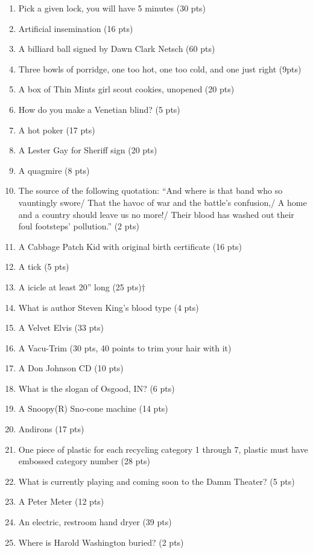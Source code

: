 \begin{enumerate}
\item Pick a given lock, you will have 5 minutes (30 pts)
\item Artificial insemination (16 pts)
\item A billiard ball signed by Dawn Clark Netsch (60 pts)
\item Three bowls of porridge, one too hot, one too cold, and one just right (9pts)
\item A box of Thin Mints {\texttrademark} girl scout cookies, unopened (20 pts)
\item How do you make a Venetian blind? (5 pts)
\item A hot poker (17 pts)
\item A Lester Gay for Sheriff sign (20 pts)
\item A quagmire (8 pts)
\item The source of the following quotation: ``And where is that band who so vauntingly swore/ That the havoc of war and the battle's confusion,/ A home and a country should leave us no more!/ Their blood has washed out their foul footsteps' pollution.'' (2 pts)
\item A Cabbage Patch Kid{\texttrademark} with original birth certificate (16 pts)
\item A tick (5 pts)
\item A icicle at least 20'' long (25 pts)$\dagger$
\item What is author Steven King's blood type (4 pts)
\item A Velvet Elvis (33 pts)
\item A Vacu-Trim{\texttrademark} (30 pts, 40 points to trim your hair with it)
\item A Don Johnson CD (10 pts)
\item What is the slogan of Osgood, IN? (6 pts)
\item A Snoopy(R) Sno-cone machine (14 pts)
\item Andirons (17 pts)
\item One piece of plastic for each recycling category 1 through 7, plastic must have embossed category number (28 pts)
\item What is currently playing and coming soon to the Damm Theater? (5 pts)
\item A Peter Meter{\texttrademark} (12 pts)
\item An electric, restroom hand dryer (39 pts)
\item Where is Harold Washington buried? (2 pts)


\end{enumerate}
